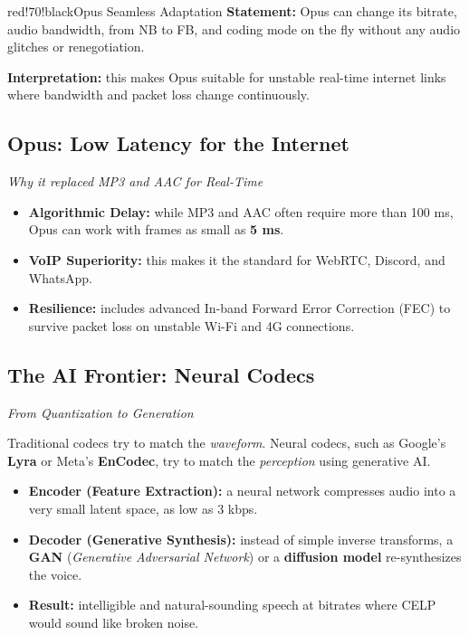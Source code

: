 \begin{calloutbox}{red!70!black}{Opus Seamless Adaptation}
\textbf{Statement:} Opus can change its bitrate, audio bandwidth, from NB to FB, and coding mode on the fly without any audio glitches or renegotiation.

\textbf{Interpretation:} this makes Opus suitable for unstable real-time internet links where bandwidth and packet loss change continuously.
\end{calloutbox}

\subsection{Opus: Low Latency for the Internet}

\textit{Why it replaced MP3 and AAC for Real-Time}

\begin{itemize}
\item \textbf{Algorithmic Delay:} while MP3 and AAC often require more than 100 ms, Opus can work with frames as small as \textbf{5 ms}.
\item \textbf{VoIP Superiority:} this makes it the standard for WebRTC, Discord, and WhatsApp.
\item \textbf{Resilience:} includes advanced In-band Forward Error Correction (FEC) to survive packet loss on unstable Wi-Fi and 4G connections.
\end{itemize}

\subsection{The AI Frontier: Neural Codecs}

\textit{From Quantization to Generation}

Traditional codecs try to match the \textit{waveform}. Neural codecs, such as Google's \textbf{Lyra} or Meta's \textbf{EnCodec}, try to match the \textit{perception} using generative AI.

\begin{itemize}
\item \textbf{Encoder (Feature Extraction):} a neural network compresses audio into a very small latent space, as low as 3 kbps.
\item \textbf{Decoder (Generative Synthesis):} instead of simple inverse transforms, a \textbf{GAN} (\textit{Generative Adversarial Network}) or a \textbf{diffusion model} re-synthesizes the voice.
\item \textbf{Result:} intelligible and natural-sounding speech at bitrates where CELP would sound like broken noise.
\end{itemize}

